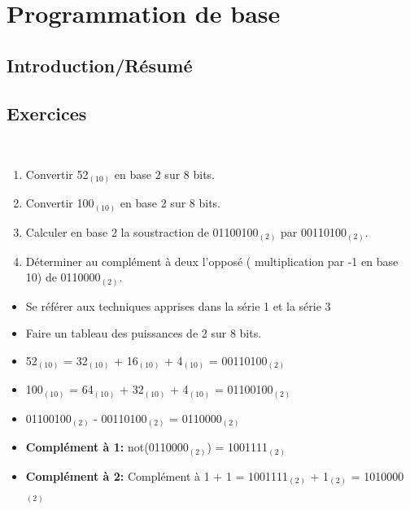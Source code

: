 \section{Programmation de base}

\subsection{Introduction/Résumé}

\subsection{Exercices}

\begin{Exercice}[Durée 5]\\
    \begin{enumerate}
        \item Convertir 52$_{(10)}$ en base 2 sur 8 bits.
        \item Convertir 100$_{(10)}$ en base 2 sur 8 bits.
        \item Calculer en base 2 la soustraction de 01100100$_{(2)}$ par 00110100$_{(2)}$.
        \item Déterminer au complément à deux l'opposé ( multiplication par -1 en base 10) de 0110000$_{(2)}$.
    \end{enumerate}
\begin{conseil}
   \begin{itemize}
       \item Se référer aux techniques apprises dans la série 1 et la série 3
       \item Faire un tableau des puissances de 2 sur 8 bits.
   \end{itemize}
\end{conseil}
    
\begin{solution}
\begin{itemize}
    \item 52$_{(10)}$ = 32$_{(10)}$ + 16$_{(10)}$ + 4$_{(10)}$ = 00110100$_{(2)}$
    \item 100$_{(10)}$ = 64$_{(10)}$ + 32$_{(10)}$ + 4$_{(10)}$ = 01100100$_{(2)}$
    \item 01100100$_{(2)}$ - 00110100$_{(2)}$ = 0110000$_{(2)}$
    \item \textbf{Complément à 1:} not(0110000$_{(2)}$) = 1001111$_{(2)}$ 
    \item \textbf{Complément à 2:} Complément à 1 + 1 = 1001111$_{(2)}$ + 1$_{(2)}$ = 1010000$_{(2)}$
\end{itemize}   
\end{solution}

\end{Exercice}



